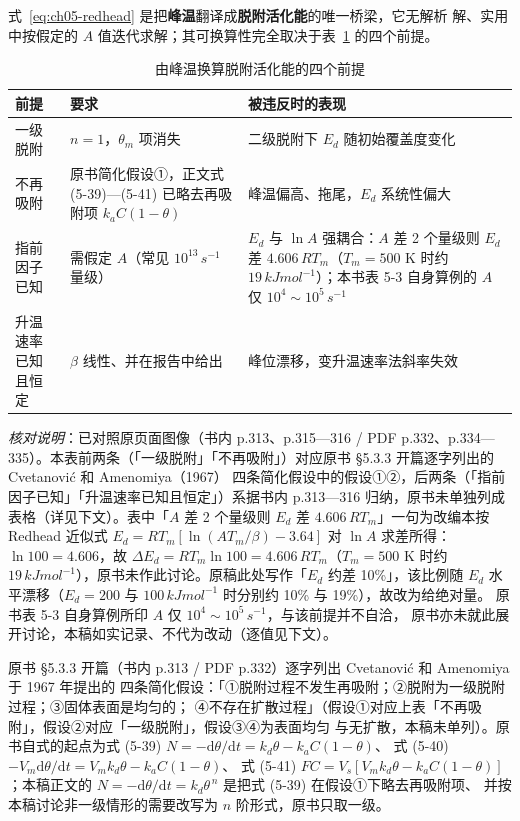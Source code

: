 式~\eqref{eq:ch05-redhead} 是把\textbf{峰温}翻译成\textbf{脱附活化能}的唯一桥梁，它无解析
解、实用中按假定的 $A$ 值迭代求解；其可换算性完全取决于表~\ref{tab:ch05-redhead} 的四个前提。

\begin{table}[htbp]
\centering
\caption{由峰温换算脱附活化能的四个前提}
\label{tab:ch05-redhead}
{\srcsize
\begin{tabularx}{\columnwidth}{@{}lXX@{}}
\toprule
前提 & 要求 & 被违反时的表现 \\
\midrule
一级脱附 & $n=1$，$\theta_m$ 项消失 & 二级脱附下 $E_d$ 随初始覆盖度变化 \\
不再吸附 & 原书简化假设①，正文式 (5-39)—(5-41) 已略去再吸附项 $k_aC(1-\theta)$ & 峰温偏高、拖尾，$E_d$ 系统性偏大 \\
指前因子已知 & 需假定 $A$（常见 $10^{13}\,\si{s^{-1}}$ 量级） & $E_d$ 与 $\ln A$ 强耦合：$A$ 差 2 个量级则 $E_d$ 差 $4.606\,RT_m$（$T_m=500$ K 时约 $19\,\si{kJ mol^{-1}}$）；本书表 5-3 自身算例的 $A$ 仅 $10^{4}\sim10^{5}\,\si{s^{-1}}$ \\
升温速率已知且恒定 & $\beta$ 线性、并在报告中给出 & 峰位漂移，变升温速率法斜率失效 \\
\bottomrule
\end{tabularx}}
\end{table}

\emph{核对说明}：已对照原页面图像（书内 p.313、p.315—316 / PDF p.332、p.334—335）。本表前两条（「一级脱附」「不再吸附」）对应原书 §5.3.3 开篇逐字列出的 Cvetanović 和 Amenomiya（1967）
四条简化假设中的假设①②，后两条（「指前因子已知」「升温速率已知且恒定」）系据书内 p.313—316 归纳，原书未单独列成表格（详见下文）。表中「$A$ 差 2 个量级则 $E_d$ 差 $4.606\,RT_m$」一句为改编本按 Redhead 近似式 $E_d=RT_m[\ln(AT_m/\beta)-3.64]$
对 $\ln A$ 求差所得：$\ln 100=4.606$，故 $\Delta E_d=R T_m\ln 100=4.606\,R T_m$（$T_m=500$ K 时约 $19\,\si{kJ mol^{-1}}$），原书未作此讨论。原稿此处写作「$E_d$ 约差 10\%」，该比例随 $E_d$ 水平漂移（$E_d=200$ 与 $100\,\si{kJ mol^{-1}}$ 时分别约 10\% 与 19\%），故改为给绝对量。
原书表 5-3 自身算例所印 $A$ 仅 $10^{4}\sim10^{5}\,\si{s^{-1}}$，与该前提并不自洽，
原书亦未就此展开讨论，本稿如实记录、不代为改动（逐值见下文）。

原书 §5.3.3 开篇（书内 p.313 / PDF p.332）逐字列出 Cvetanović 和 Amenomiya 于 1967 年提出的
四条简化假设：「①脱附过程不发生再吸附；②脱附为一级脱附过程；③固体表面是均匀的；
④不存在扩散过程」（假设①对应上表「不再吸附」，假设②对应「一级脱附」，假设③④为表面均匀
与无扩散，本稿未单列）。原书自式的起点为式 (5-39) $N=-\mathrm{d}\theta/\mathrm{d}t=k_d\theta-k_aC(1-\theta)$、
式 (5-40) $-V_m\mathrm{d}\theta/\mathrm{d}t=V_mk_d\theta-k_aC(1-\theta)$、
式 (5-41) $FC=V_s[V_mk_d\theta-k_aC(1-\theta)]$；本稿正文的
$N=-\mathrm{d}\theta/\mathrm{d}t=k_d\theta^{\,n}$ 是把式 (5-39) 在假设①下略去再吸附项、
并按本稿讨论非一级情形的需要改写为 $n$ 阶形式，原书只取一级。

